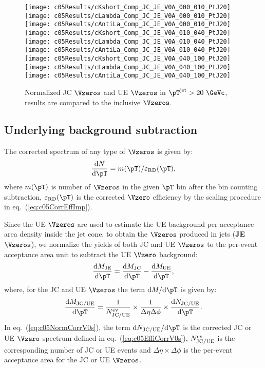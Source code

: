\begin{figure}[htb]
\begin{center}
\texttt{[image: c05Results/cKshort\_Comp\_JC\_JE\_V0A\_000\_010\_PtJ20]}
\texttt{[image: c05Results/cLambda\_Comp\_JC\_JE\_V0A\_000\_010\_PtJ20]}
\texttt{[image: c05Results/cAntiLa\_Comp\_JC\_JE\_V0A\_000\_010\_PtJ20]}
\texttt{[image: c05Results/cKshort\_Comp\_JC\_JE\_V0A\_010\_040\_PtJ20]}
\texttt{[image: c05Results/cLambda\_Comp\_JC\_JE\_V0A\_010\_040\_PtJ20]}
\texttt{[image: c05Results/cAntiLa\_Comp\_JC\_JE\_V0A\_010\_040\_PtJ20]}
\texttt{[image: c05Results/cKshort\_Comp\_JC\_JE\_V0A\_040\_100\_PtJ20]}
\texttt{[image: c05Results/cLambda\_Comp\_JC\_JE\_V0A\_040\_100\_PtJ20]}
\texttt{[image: c05Results/cAntiLa\_Comp\_JC\_JE\_V0A\_040\_100\_PtJ20]}
\caption{Normalized JC $\Vzeros$ and UE $\Vzeros$ in $\pT^{\rm jet}>20~\GeVc$,
         results are compared to the inclusive $\Vzeros$.}
\label{fig:c05RestulsCompJCPtJ20}
\end{center}
\end{figure}



\subsection{Underlying background subtraction}\label{sec:c05NormV0s}

The corrected spectrum of any type of $\Vzeros$
is given by:
\begin{equation}\label{eq:c05EffiCorrV0s}
\frac{{\rm d}N}{{\rm d}\pT}=m(\pT)/\varepsilon_{\rm RD}(\pT),
\end{equation}
where $m(\pT)$ is number of $\Vzeros$ in the given $\pT$ bin after the
bin counting subtraction,
$\varepsilon_{\rm RD}(\pT)$ is the corrected $\Vzero$ efficiency by the
scaling procedure in eq.~(\ref{eq:c05CorrEffImp}).

Since the UE $\Vzeros$ are used to estimate the UE background per acceptance
area density inside the jet cone,
to obtain the $\Vzeros$ produced in jets ({\bf JE $\mathbf\Vzeros$}),
we normalize the yields of both JC and UE $\Vzeros$ to the
per-event acceptance area unit to subtract the UE $\Vzero$ background:
\begin{equation}\label{eq:c05NormV0sJE}
\frac{{\rm d}M_{\rm JE}}{{\rm d}\pT}=
\frac{{\rm d}M_{\rm JC}}{{\rm d}\pT}-\frac{{\rm d}M_{\rm UE}}{{\rm d}\pT},
\end{equation}
where, for the JC and UE $\Vzeros$ the term ${\rm d}M/{\rm d}\pT$ is given by:
\begin{equation}\label{eq:c05NormCorrV0s}
\frac{{\rm d}M_{\rm JC/UE}}{{\rm d}\pT}=
\frac{1}{N_{\rm JC/UE}^{\rm ev}}\times\frac{1}{\Delta\eta\Delta\phi}\times
\frac{{\rm d}N_{\rm JC/UE}}{{\rm d}\pT}.
\end{equation}
In eq.~(\ref{eq:c05NormCorrV0s}),
the term ${\rm d}N_{\rm JC/UE}/{\rm d}\pT$ is the corrected JC or
UE $\Vzero$ spectrum defined in eq.~(\ref{eq:c05EffiCorrV0s}),
$N_{\rm JC/UE}^{\rm ev}$ is the corresponding number of JC or UE events and
$\Delta\eta\times\Delta\phi$ is the per-event acceptance area for
the JC or UE $\Vzeros$.

